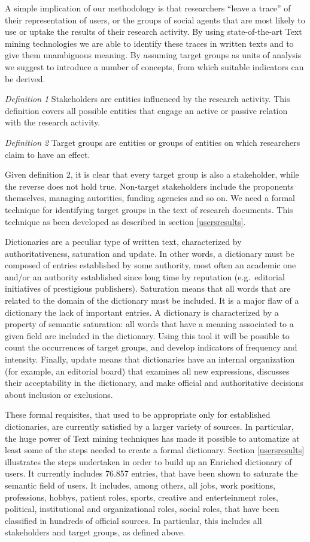 \documentclass[]{book}
\begin{document}
A simple implication of our methodology is that researchers ``leave a
trace'' of their representation of users, or the groups of social agents
that are most likely to use or uptake the results of their research
activity. By using state-of-the-art Text mining technologies we are able
to identify these traces in written texts and to give them unambiguous
meaning. By assuming target groups as units of analysis we suggest to
introduce a number of concepts, from which suitable indicators can be
derived.

\emph{Definition 1} Stakeholders are entities influenced by the research
activity. This definition covers all possible entities that engage an
active or passive relation with the research activity.

\emph{Definition 2} Target groups are entities or groups of entities on
which researchers claim to have an effect.

Given definition 2, it is clear that every target group is also a
stakeholder, while the reverse does not hold true. Non-target
stakeholders include the proponents themselves, managing autorities,
funding agencies and so on. We need a formal technique for identifying
target groups in the text of research documents. This technique as been
developed as described in section \ref{usersresults}.

Dictionaries are a peculiar type of written text, characterized by
authoritativeness, saturation and update. In other words, a dictionary
must be composed of entries established by some authority, most often an
academic one and/or an authority established since long time by
reputation (e.g.~editorial initiatives of prestigious publishers).
Saturation means that all words that are related to the domain of the
dictionary must be included. It is a major flaw of a dictionary the lack
of important entries. A dictionary is characterized by a property of
semantic saturation: all words that have a meaning associated to a given
field are included in the dictionary. Using this tool it will be
possible to count the occurrences of target groups, and develop
indicators of frequency and intensity. Finally, update means that
dictionaries have an internal organization (for example, an editorial
board) that examines all new expressions, discusses their acceptability
in the dictionary, and make official and authoritative decisions about
inclusion or exclusions.

These formal requisites, that used to be appropriate only for
established dictionaries, are currently satisfied by a larger variety of
sources. In particular, the huge power of Text mining techniques has
made it possible to automatize at least some of the steps needed to
create a formal dictionary. Section \ref{usersresults} illustrates the
steps undertaken in order to build up an Enriched dictionary of users.
It currently includes 76.857 entries, that have been shown to saturate
the semantic field of users. It includes, among others, all jobs, work
positions, professions, hobbys, patient roles, sports, creative and
enterteinment roles, political, institutional and organizational roles,
social roles, that have been classified in hundreds of official sources.
In particular, this includes all stakeholders and target groups, as
defined above.
\end{document}
